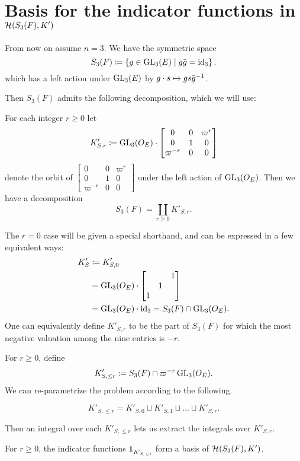 \section{Basis for the indicator functions in $\mathcal H(S_3(F), K')$}
\label{ch:orbital0_hecke_basis}
From now on assume $n = 3$.
We have the symmetric space
\[ S_3(F) \coloneqq \left\{ g \in \operatorname{GL}_3(E) \mid g \bar{g} = \operatorname{id}_3 \right\}. \]
which has a left action under $\operatorname{GL}_3(E)$ by $g \cdot s \mapsto gs\bar{g}^{-1}$.

Then $S_3(F)$ admits the following decomposition, which we will use:
\begin{lemma}
  For each integer $r \ge 0$ let
  \[ K'_{S,r} \coloneqq \operatorname{GL}_3(O_E) \cdot \begin{bmatrix} 0 & 0 & \varpi^r \\ 0 & 1 & 0 \\ \varpi^{-r} & 0 & 0 \end{bmatrix} \]
  denote the orbit of
  $\begin{bmatrix} 0 & 0 & \varpi^r \\ 0 & 1 & 0 \\ \varpi^{-r} & 0 & 0 \end{bmatrix}$
  under the left action of $\operatorname{GL}_3(O_E)$.
  Then we have a decomposition
  \[ S_3(F) = \coprod_{r \geq 0} K'_{S,r}. \]
\end{lemma}
The $r=0$ case will be given a special shorthand,
and can be expressed in a few equivalent ways:
\begin{align*}
  K'_S
  &\coloneqq K'_{S,0} \\
  &= \operatorname{GL}_3(O_E) \cdot \begin{bmatrix} & & 1 \\ & 1 \\ 1 \end{bmatrix} \\
  &= \operatorname{GL}_3(O_E) \cdot \operatorname{id}_3 = S_3(F) \cap \operatorname{GL}_3(O_E).
\end{align*}
One can equivalently define $K'_{S,r}$ to be the part of $S_3(F)$
for which the most negative valuation among the nine entries is $-r$.

For $r \geq 0$, define
\[ K'_{S, \le r} \coloneqq S_3(F) \cap \varpi^{-r} \operatorname{GL}_3(O_E). \]
We can re-parametrize the problem according to the following.
\begin{proposition}
  \[ K'_{S, \le r} = K'_{S,0} \sqcup K'_{S,1} \sqcup \dots \sqcup K'_{S,r}. \]
\end{proposition}
Then an integral over each $K'_{S, \le r}$ lets us extract the integrals over $K'_{S,r}$.
\begin{proposition}
  For $r \ge 0$, the indicator functions $\mathbf{1}_{K'_{S, \le r}}$
  form a basis of $\mathcal H(S_3(F), K')$.
\end{proposition}

